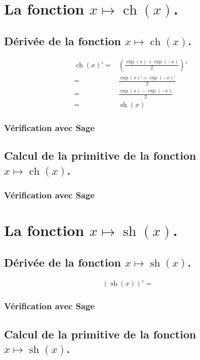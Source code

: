 \documentclass[a4paper,14pt]{extreport} %
\renewcommand{\sinh}{\mathop{\mathrm{sh}}}
\renewcommand{\cosh}{\mathop{\mathrm{ch}}}
\begin{document}
\section{La fonction  $x \mapsto \cosh(x)$.}

\subsection{Dérivée de la fonction $x \mapsto \cosh(x)$.}
\begin{align*}
\cosh(x)' =& \left( \frac{\exp(x)+\exp(-x)}{2} \right)' \\ =& \frac{\exp(x)'+\exp(-x)'}{2} \\=& \frac{\exp(x)-\exp(-x)}{2} \\=& \sinh(x)
\end{align*}


\subsubsection{Vérification avec Sage}

\subsection{Calcul de la primitive de la fonction  $x \mapsto \cosh(x)$.}

\subsubsection{Vérification avec Sage}



\section{La fonction  $x \mapsto \sinh(x)$.}


\subsection{Dérivée de la fonction $x \mapsto \sinh(x)$.}

\begin{align*}
(\sinh(x))' = &
\end{align*}


\subsubsection{Vérification avec Sage}


\subsection{Calcul de la primitive de la fonction  $x \mapsto \sinh(x)$.}
\end{document}
